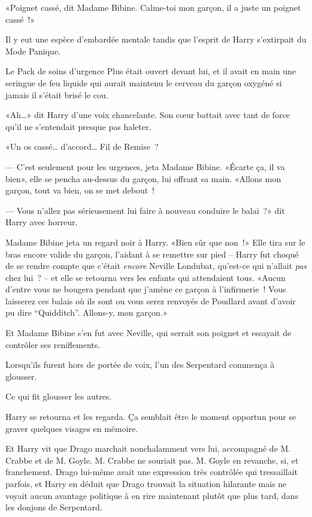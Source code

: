 «Poignet cassé, dit Madame Bibine. Calme-toi mon garçon, il a juste un poignet cassé~!»

Il y eut une espèce d'embardée mentale tandis que l'esprit de Harry s'extirpait du Mode Panique.

Le Pack de soins d'urgence Plus était ouvert devant lui, et il avait en main une seringue de feu liquide qui aurait maintenu le cerveau du garçon oxygéné si jamais il s'était brisé le cou.

«Ah…» dit Harry d'une voix chancelante. Son cœur battait avec tant de force qu'il ne s'entendait presque pas haleter.

«Un os cassé… d'accord… Fil de Remise~?

--- C'est seulement pour les urgences, jeta Madame Bibine. «Écarte ça, il va bien», elle se pencha au-dessus du garçon, lui offrant sa main. «Allons mon garçon, tout va bien, on se met debout~!

--- Vous n'allez pas sérieusement lui faire à nouveau conduire le balai~?» dit Harry avec horreur.

Madame Bibine jeta un regard noir à Harry. «Bien sûr que non~!» Elle tira sur le bras encore valide du garçon, l'aidant à se remettre sur pied -- Harry fut choqué de se rendre compte que c'était \emph{encore} Neville Londubat, qu'est-ce qui n'allait \emph{pas} chez lui~? -- et elle se retourna vers les enfants qui attendaient tous. «Aucun d'entre vous ne bougera pendant que j'amène ce garçon à l'infirmerie~! Vous laisserez ces balais où ils sont ou vous serez renvoyés de Poudlard avant d'avoir pu dire “Quidditch”. Allons-y, mon garçon.»

Et Madame Bibine s'en fut avec Neville, qui serrait son poignet et essayait de contrôler ses reniflements.

Lorsqu'ils furent hors de portée de voix, l'un des Serpentard commença à glousser.

Ce qui fit glousser les autres.

Harry se retourna et les regarda. Ça semblait être le moment opportun pour se graver quelques visages en mémoire.

Et Harry vit que Drago marchait nonchalamment vers lui, accompagné de M. Crabbe et de M. Goyle. M. Crabbe ne souriait pas. M. Goyle en revanche, si, et franchement. Drago lui-même avait une expression très contrôlée qui tressaillait parfois, et Harry en déduit que Drago trouvait la situation hilarante mais ne voyait aucun avantage politique à en rire maintenant plutôt que plus tard, dans les donjons de Serpentard.

